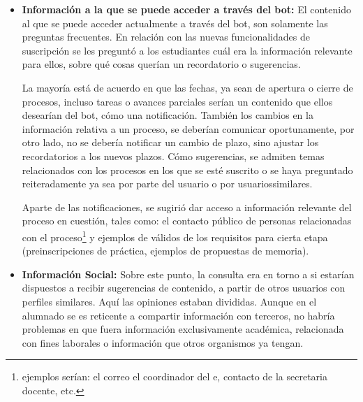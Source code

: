     \begin{itemize}
        \item \textbf{Información a la que se puede acceder a través del bot:} El contenido al que se puede acceder actualmente a través del bot, son solamente las preguntas frecuentes. En relación con las nuevas funcionalidades de suscripción se les preguntó a los estudiantes cuál era la información relevante para ellos, sobre qué cosas querían un recordatorio o sugerencias.
        \par La mayoría está de acuerdo en que las fechas, ya sean de apertura o cierre de procesos, incluso tareas o avances parciales serían un contenido que ellos desearían del bot, cómo una notificación. También los cambios en la información relativa a un proceso, se deberían comunicar oportunamente, por otro lado, no se debería notificar un cambio de plazo, sino ajustar los recordatorios a los nuevos plazos. Cómo sugerencias, se admiten temas relacionados con los procesos en los que se esté suscrito o se haya preguntado reiteradamente ya sea por parte del usuario o por usuarios\guillemotleft similares\guillemotright.
        \par Aparte de las notificaciones, se sugirió dar acceso a información relevante del proceso en cuestión, tales como: el contacto público de personas relacionadas con el proceso\footnote{ejemplos serían: el correo el coordinador del \acrshort{e}, contacto de la secretaria docente, etc.} y ejemplos de válidos de los requisitos para cierta etapa (preinscripciones de práctica, ejemplos de propuestas de memoria).

        \item \textbf{Información Social:} Sobre este punto, la consulta era en torno a si estarían dispuestos a recibir sugerencias de contenido, a partir de otros usuarios con perfiles similares.
        Aquí las opiniones estaban divididas. Aunque en el alumnado se es reticente a compartir información con terceros, no habría problemas en que fuera información exclusivamente académica, relacionada con fines laborales o información que otros organismos ya tengan.


\end{itemize}
